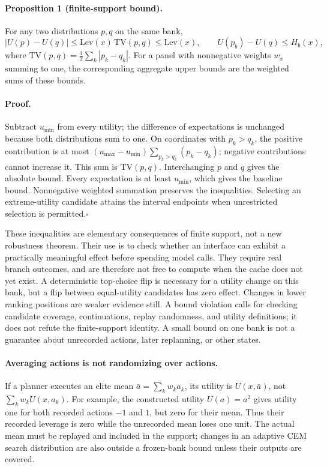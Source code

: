 {\paragraph{Proposition 1 (finite-support bound).}
For any two distributions $p,q$ on the same bank,
\begin{equation}
 |U(p)-U(q)|\leq \mathrm{Lev}(x)\,\mathrm{TV}(p,q)
 \leq\mathrm{Lev}(x),\qquad
 U(p_b)-U(q)\leq H_b(x),
 \label{eq:bound}
\end{equation}
where $\mathrm{TV}(p,q)=\tfrac12\sum_k|p_k-q_k|$.
For a panel with nonnegative weights $w_x$ summing to one, the corresponding
aggregate upper bounds are the weighted sums of these bounds.

\paragraph{Proof.}
Subtract $u_{\min}$ from every utility; the difference of expectations is
unchanged because both distributions sum to one. On coordinates with
$p_k>q_k$, the positive contribution is at most
$(u_{\max}-u_{\min})\sum_{p_k>q_k}(p_k-q_k)$; negative contributions
cannot increase it. This sum is $\mathrm{TV}(p,q)$. Interchanging $p$ and
$q$ gives the absolute bound. Every expectation is at least $u_{\min}$,
which gives the baseline bound. Nonnegative weighted summation preserves
the inequalities. Selecting an extreme-utility candidate attains the
interval endpoints when unrestricted selection is permitted.\hfill$\square$

These inequalities are elementary consequences of finite support, not a
new robustness theorem. Their use is to check whether an interface can
exhibit a practically meaningful effect before spending model calls.
They require real branch outcomes, and are therefore not free to compute
when the cache does not yet exist. A deterministic top-choice flip is
necessary for a utility change on this bank, but a flip between equal-utility
candidates has zero effect. Changes in lower ranking positions are weaker
evidence still. A bound violation calls for checking candidate coverage,
continuations, replay randomness, and utility definitions; it does not
refute the finite-support identity. A small bound on one bank is not a
guarantee about unrecorded actions, later replanning, or other states.

\paragraph{Averaging actions is not randomizing over actions.}
If a planner executes an elite mean $\bar a=\sum_k w_k a_k$, its utility is
$U(x,\bar a)$, not $\sum_k w_k U(x,a_k)$. For example, the constructed
utility $U(a)=a^2$ gives utility one for both recorded actions $-1$ and $1$,
but zero for their mean. Thus their recorded leverage is zero while the
unrecorded mean loses one unit. The actual mean must be replayed and
included in the support; changes in an adaptive CEM search distribution
are also outside a frozen-bank bound unless their outputs are covered.

}
